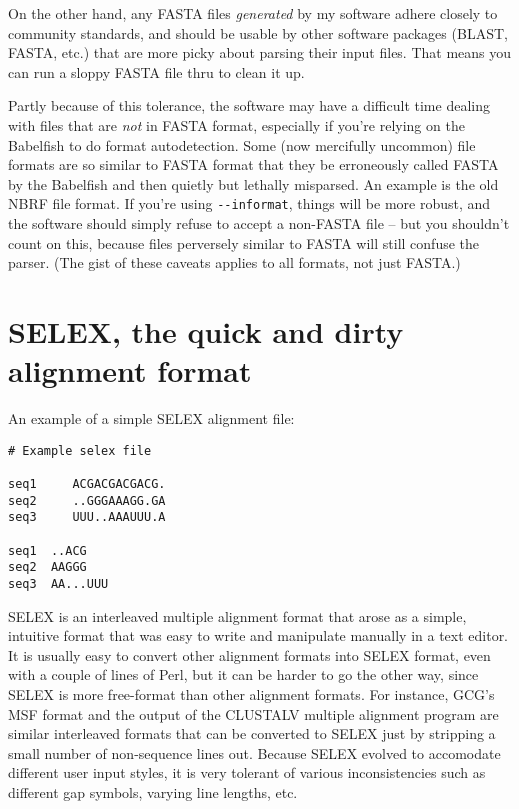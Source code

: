On the other hand, any FASTA files \emph{generated} by my software
adhere closely to community standards, and should be usable by other
software packages (BLAST, FASTA, etc.) that are more picky about
parsing their input files. That means you can run a sloppy FASTA file
thru  to clean it up.

Partly because of this tolerance, the software may have a difficult
time dealing with files that are \textit{not} in FASTA format,
especially if you're relying on the Babelfish to do format
autodetection.  Some (now mercifully uncommon) file formats are so
similar to FASTA format that they be erroneously called FASTA by the
Babelfish and then quietly but lethally misparsed. An example is the
old NBRF file format. If you're using \verb+--informat+, things will
be more robust, and the software should simply refuse to accept a
non-FASTA file -- but you shouldn't count on this, because files
perversely similar to FASTA will still confuse the parser.  (The gist
of these caveats applies to all formats, not just FASTA.)

\section{SELEX, the quick and dirty alignment format}

An example of a simple SELEX alignment file:

\begin{verbatim}
# Example selex file

seq1     ACGACGACGACG.
seq2     ..GGGAAAGG.GA
seq3     UUU..AAAUUU.A

seq1  ..ACG
seq2  AAGGG
seq3  AA...UUU
\end{verbatim}

SELEX is an interleaved multiple alignment format that arose as a
simple, intuitive format that was easy to write and manipulate
manually in a text editor. It is usually easy to convert other
alignment formats into SELEX format, even with a couple of lines of
Perl, but it can be harder to go the other way, since SELEX is more
free-format than other alignment formats. For instance, GCG's MSF
format and the output of the CLUSTALV multiple alignment program are
similar interleaved formats that can be converted to SELEX just by
stripping a small number of non-sequence lines out. Because SELEX
evolved to accomodate different user input styles, it is very tolerant
of various inconsistencies such as different gap symbols, varying line
lengths, etc.

